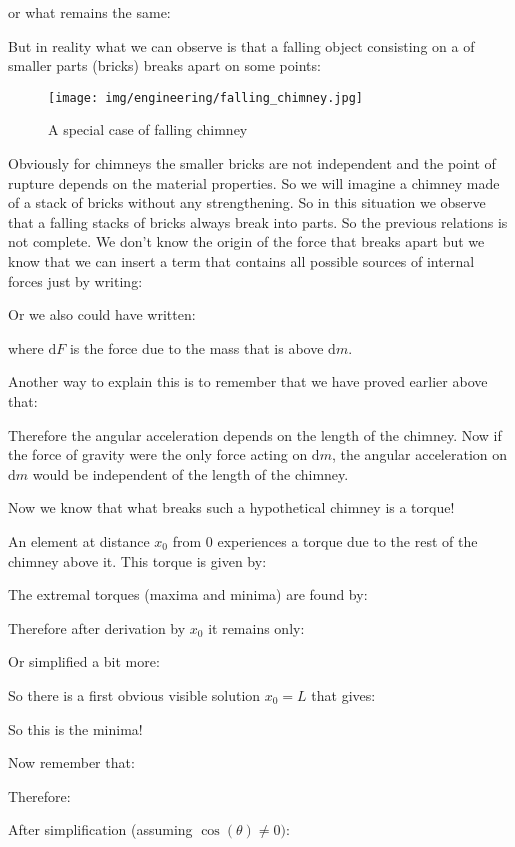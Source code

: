 	or what remains the same:
	
	But in reality what we can observe is that a falling object consisting on a of smaller parts (bricks) breaks apart on some points:
	\begin{figure}[H]
		\centering
		\texttt{[image: img/engineering/falling\_chimney.jpg]}
		\caption{A special case of falling chimney}
	\end{figure}
	Obviously for chimneys the smaller bricks are not independent and the point of rupture depends on the material properties. So we will imagine a chimney made of a stack of bricks without any strengthening. So in this situation we observe that a falling stacks of bricks always break into parts. So the previous relations is not complete. We don't know the origin of the force that breaks apart but we know that we can insert a term that contains all possible sources of internal forces just by writing:
	
	Or we also could have written:
	
	where $\mathrm{d}F$ is the force due to the mass that is above $\mathrm{d}m$.
	\begin{tcolorbox}[title=Remark,colframe=black,arc=10pt]
	Another way to explain this is to remember that we have proved earlier above that:
	
	Therefore the angular acceleration depends on the length of the chimney. Now if the force of gravity were the only force acting on $\mathrm{d}m$, the angular acceleration on $\mathrm{d}m$ would be independent of the length of the chimney.
	\end{tcolorbox}
	
	Now we know that what breaks such a hypothetical chimney is a torque!
	
	An element at distance $x_0$ from $0$ experiences a torque due to the rest of the chimney above it. This torque is given by:
	
	The extremal torques (maxima and minima) are found by:
	
	Therefore after derivation by $x_0$ it remains only:
	
	Or simplified a bit more:
	
	So there is a first obvious visible solution $x_0=L$ that gives:
	
	So this is the minima!
	
	Now remember that:
	
	Therefore:
	
	After simplification (assuming $\cos(\theta)\neq 0)$:
	

